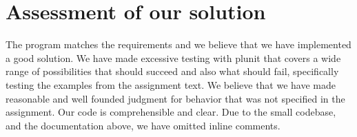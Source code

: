 \documentclass{article}
\begin{document}
\section{Assessment of our solution}
The program matches the requirements and we believe that we have implemented a
good solution. We have made excessive testing with plunit that covers a wide
range of possibilities that should succeed and also what should fail,
specifically testing the examples from the assignment text. We believe
that we have made reasonable and well founded judgment for behavior that was not
specified in the assignment.
Our code is comprehensible and clear. Due to the small codebase, and the
documentation above, we have omitted inline comments.
\end{document}
